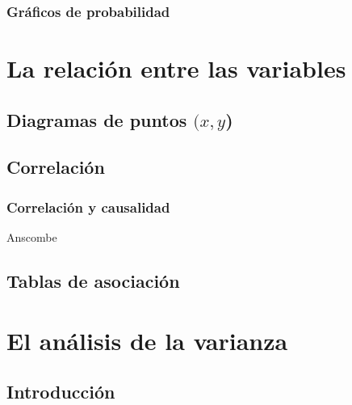\documentclass[
  letterpaper,
]{scrbook}
\begin{document}
\hypertarget{gruxe1ficos-de-probabilidad}{%
\subsection{Gráficos de
probabilidad}\label{gruxe1ficos-de-probabilidad}}


\hypertarget{la-relaciuxf3n-entre-las-variables}{%
\chapter{La relación entre las
variables}\label{la-relaciuxf3n-entre-las-variables}}

\hypertarget{diagramas-de-puntos-xy}{%
\section{\texorpdfstring{Diagramas de puntos
\((x,y\))}{Diagramas de puntos (x,y)}}\label{diagramas-de-puntos-xy}}

\hypertarget{correlaciuxf3n}{%
\section{Correlación}\label{correlaciuxf3n}}

\hypertarget{correlaciuxf3n-y-causalidad}{%
\subsection{Correlación y
causalidad}\label{correlaciuxf3n-y-causalidad}}

Anscombe

\hypertarget{tablas-de-asociaciuxf3n}{%
\section{Tablas de asociación}\label{tablas-de-asociaciuxf3n}}


\hypertarget{el-anuxe1lisis-de-la-varianza}{%
\chapter{El análisis de la
varianza}\label{el-anuxe1lisis-de-la-varianza}}

\hypertarget{introducciuxf3n-1}{%
\section{Introducción}\label{introducciuxf3n-1}}
\end{document}
